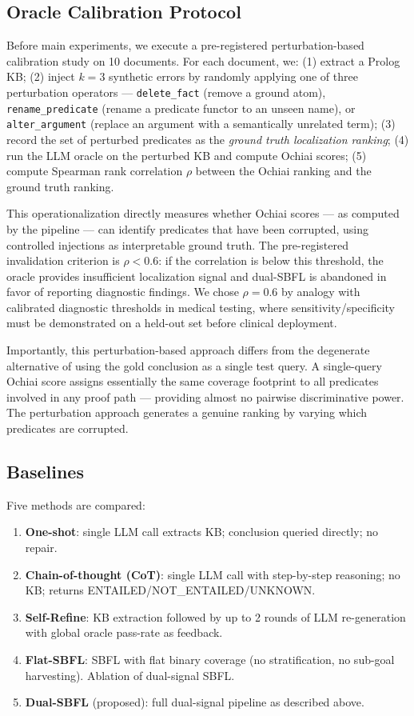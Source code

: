 \documentclass[11pt,letterpaper]{article}
\begin{document}
\subsection{Oracle Calibration Protocol}

Before main experiments, we execute a pre-registered perturbation-based calibration study on 10 documents. For each document, we: (1) extract a Prolog KB; (2) inject $k=3$ synthetic errors by randomly applying one of three perturbation operators — \texttt{delete\_fact} (remove a ground atom), \texttt{rename\_predicate} (rename a predicate functor to an unseen name), or \texttt{alter\_argument} (replace an argument with a semantically unrelated term); (3) record the set of perturbed predicates as the \emph{ground truth localization ranking}; (4) run the LLM oracle on the perturbed KB and compute Ochiai scores; (5) compute Spearman rank correlation $\rho$ between the Ochiai ranking and the ground truth ranking.

This operationalization directly measures whether Ochiai scores — as computed by the pipeline — can identify predicates that have been corrupted, using controlled injections as interpretable ground truth. The pre-registered invalidation criterion is $\rho < 0.6$: if the correlation is below this threshold, the oracle provides insufficient localization signal and dual-SBFL is abandoned in favor of reporting diagnostic findings. We chose $\rho = 0.6$ by analogy with calibrated diagnostic thresholds in medical testing, where sensitivity/specificity must be demonstrated on a held-out set before clinical deployment.

Importantly, this perturbation-based approach differs from the degenerate alternative of using the gold conclusion as a single test query. A single-query Ochiai score assigns essentially the same coverage footprint to all predicates involved in any proof path — providing almost no pairwise discriminative power. The perturbation approach generates a genuine ranking by varying which predicates are corrupted.

\subsection{Baselines}

Five methods are compared:
\begin{enumerate}
  \item \textbf{One-shot}: single LLM call extracts KB; conclusion queried directly; no repair.
  \item \textbf{Chain-of-thought (CoT)}: single LLM call with step-by-step reasoning; no KB; returns ENTAILED/NOT\_ENTAILED/UNKNOWN.
  \item \textbf{Self-Refine}: KB extraction followed by up to 2 rounds of LLM re-generation with global oracle pass-rate as feedback.
  \item \textbf{Flat-SBFL}: SBFL with flat binary coverage (no stratification, no sub-goal harvesting). Ablation of dual-signal SBFL.
  \item \textbf{Dual-SBFL} (proposed): full dual-signal pipeline as described above.
\end{enumerate}
\end{document}
